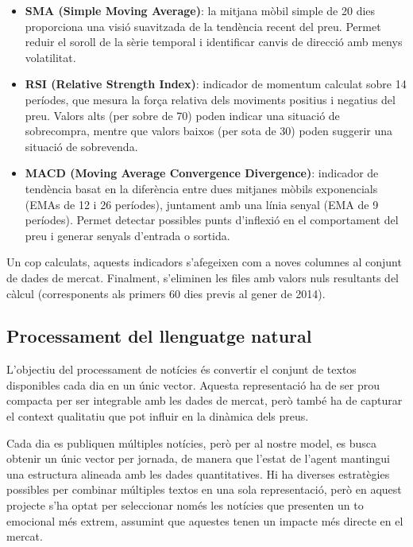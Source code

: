 \documentclass[12pt,a4paper,twoside]{book}
\begin{document}
\begin{itemize}
    \item \textbf{SMA (Simple Moving Average)}: la mitjana mòbil simple de 20 dies proporciona una visió suavitzada de la tendència recent del preu. Permet reduir el soroll de la sèrie temporal i identificar canvis de direcció amb menys volatilitat.

    \item \textbf{RSI (Relative Strength Index)}: indicador de momentum calculat sobre 14 períodes, que mesura la força relativa dels moviments positius i negatius del preu. Valors alts (per sobre de 70) poden indicar una situació de sobrecompra, mentre que valors baixos (per sota de 30) poden suggerir una situació de sobrevenda.

    \item \textbf{MACD (Moving Average Convergence Divergence)}: indicador de tendència basat en la diferència entre dues mitjanes mòbils exponencials (EMAs de 12 i 26 períodes), juntament amb una línia senyal (EMA de 9 períodes). Permet detectar possibles punts d'inflexió en el comportament del preu i generar senyals d'entrada o sortida.
\end{itemize}

Un cop calculats, aquests indicadors s'afegeixen com a noves columnes al conjunt de dades de mercat. Finalment, s'eliminen les files amb valors nuls resultants del càlcul (corresponents als primers 60 dies previs al gener de 2014).

\subsection{Processament del llenguatge natural}

L'objectiu del processament de notícies és convertir el conjunt de textos disponibles cada dia en un únic vector. Aquesta representació ha de ser prou compacta per ser integrable amb les dades de mercat, però també ha de capturar el context qualitatiu que pot influir en la dinàmica dels preus.

Cada dia es publiquen múltiples notícies, però per al nostre model, es busca obtenir un únic vector per jornada, de manera que l'estat de l'agent mantingui una estructura alineada amb les dades quantitatives. Hi ha diverses estratègies possibles per combinar múltiples textos en una sola representació, però en aquest projecte s'ha optat per seleccionar només les notícies que presenten un to emocional més extrem, assumint que aquestes tenen un impacte més directe en el mercat.
\end{document}
